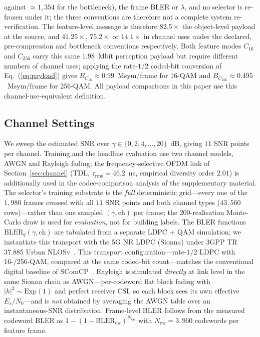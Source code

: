 \documentclass[journal]{IEEEtran}
\begin{document}
against ${\approx}1{,}354$ for the bottleneck), the frame BLER or $\lambda$, and no selector is re-frozen under it; the three conventions are therefore not a complete system re-verification. The feature-level message is therefore $82.5\times$ the object-level payload at the source, and $41.25\times$, $75.2\times$ or $14.1\times$ in channel uses under the declared, pre-compression and bottleneck conventions respectively. Both feature modes $C_{16}$ and $C_{256}$ carry this same $1.98$~Mbit perception payload but require different numbers of channel uses; applying the rate-$1/2$ coded-bit conversion of Eq.~(\ref{eq:payload}) gives $B_{C_{16}} \approx 0.99$~Msym/frame for 16-QAM and $B_{C_{256}} \approx 0.495$~Msym/frame for 256-QAM. All payload comparisons in this paper use this channel-use-equivalent definition.

\subsection{Channel Settings}

We sweep the estimated SNR over $\gamma \in \{0,2,4,\ldots,20\}$~dB, giving $11$ SNR points per channel. Training and the headline evaluation use two channel models, AWGN and Rayleigh fading; the frequency-selective OFDM link of Section~\ref{sec:channel} (TDL, $\tau_{\mathrm{rms}}=46.2$~ns, empirical diversity order $2.01$) is additionally used in the codec-comparison analysis of the supplementary material. The selector's training substrate is the \emph{full} deterministic grid---every one of the $1{,}980$ frames crossed with all $11$ SNR points and both channel types ($43{,}560$ rows)---rather than one sampled $(\gamma,\text{ch})$ per frame; the $200$-realisation Monte-Carlo draw is used for \emph{evaluation}, not for building labels. The BLER functions $\mathrm{BLER}_q(\gamma,\text{ch})$ are tabulated from a separate LDPC + QAM simulation; we instantiate this transport with the 5G NR LDPC (Sionna) under 3GPP TR 37.885 Urban NLOSv~\cite{3gpp37885}. This transport configuration---rate-$1/2$ LDPC with 16-/256-QAM, compared at the same coded-bit count---matches the conventional digital baseline of SComCP~\cite{gan2026scomcp}. Rayleigh is simulated \emph{directly} at link level in the same Sionna chain as AWGN---per-codeword flat block fading with $|h|^2\sim\mathrm{Exp}(1)$ and perfect receiver CSI, so each block sees its own effective $E_s/N_0$---and is \emph{not} obtained by averaging the AWGN table over an instantaneous-SNR distribution. Frame-level BLER follows from the measured codeword BLER as $1-(1-\mathrm{BLER}_{\mathrm{cw}})^{N_{\mathrm{cw}}}$ with $N_{\mathrm{cw}}=3{,}960$ codewords per feature frame.
\end{document}
